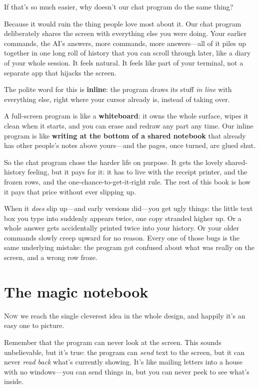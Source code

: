 \documentclass[11pt,twoside]{book}
\begin{document}
If that's so much easier, why doesn't our chat program do the same thing?

Because it would ruin the thing people love most about it. Our chat program
deliberately shares the screen with everything else you were doing. Your
earlier commands, the AI's answers, more commands, more answers---all of it
piles up together in one long roll of history that you can scroll through
later, like a diary of your whole session. It feels natural. It feels like
part of your terminal, not a separate app that hijacks the screen.

The polite word for this is \textbf{inline}: the program draws its stuff
\emph{in line} with everything else, right where your cursor already is,
instead of taking over.

\begin{pic}
A full-screen program is like a \textbf{whiteboard}: it owns the whole
surface, wipes it clean when it starts, and you can erase and redraw any
part any time. Our inline program is like \textbf{writing at the bottom of a
shared notebook} that already has other people's notes above yours---and the
pages, once turned, are glued shut.
\end{pic}

So the chat program chose the harder life on purpose. It gets the lovely
shared-history feeling, but it pays for it: it has to live with the receipt
printer, and the frozen rows, and the one-chance-to-get-it-right rule. The
rest of this book is how it pays that price without ever slipping up.

When it \emph{does} slip up---and early versions did---you get ugly things:
the little text box you type into suddenly appears twice, one copy stranded
higher up. Or a whole answer gets accidentally printed twice into your
history. Or your older commands slowly creep upward for no reason. Every one
of those bugs is the same underlying mistake: the program got confused about
what was really on the screen, and a wrong row froze.

\chapter{The magic notebook}
\lettrine{N}{ow} we reach the single cleverest idea in the whole design, and
happily it's an easy one to picture.

Remember that the program can never look at the screen. This sounds
unbelievable, but it's true: the program can \emph{send} text to the screen,
but it can never \emph{read back} what's currently showing. It's like
mailing letters into a house with no windows---you can send things in, but
you can never peek to see what's inside.
\end{document}
